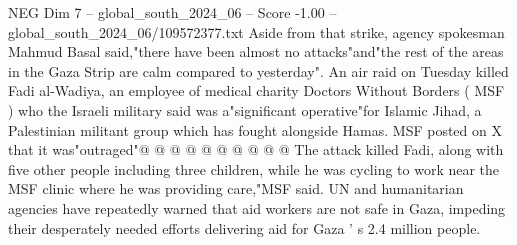 \begin{textsample}{NEG Dim 7 – global\_south\_2024\_06 – Score -1.00 – global\_south\_2024\_06/109572377.txt}
Aside from that strike, agency spokesman Mahmud Basal said,"there have been almost no attacks"and"the rest of the areas in the Gaza Strip are calm compared to yesterday".
An air raid on Tuesday killed Fadi al-Wadiya, an employee of medical charity Doctors Without Borders ( MSF ) who the Israeli military said was a"significant operative"for Islamic Jihad, a Palestinian militant group which has fought alongside Hamas.
MSF posted on X that it was"outraged"@ @ @ @ @ @ @ @ @ @ The attack killed Fadi, along with five other people including three children, while he was cycling to work near the MSF clinic where he was providing care,"MSF said.
UN and humanitarian agencies have repeatedly warned that aid workers are not safe in Gaza, impeding their desperately needed efforts delivering aid for Gaza ' s 2.4 million people.

\end{textsample}
